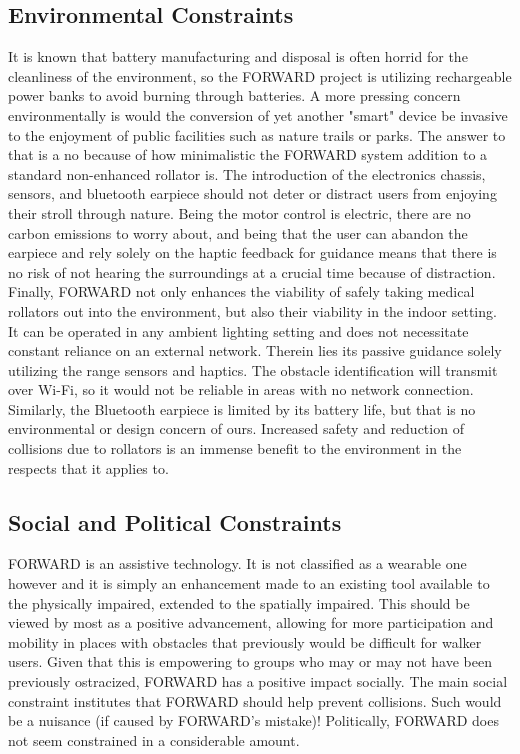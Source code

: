 \subsection{Environmental Constraints}
\noindent It is known that battery manufacturing and disposal is often horrid for the cleanliness of the environment, so the FORWARD project is utilizing rechargeable power banks to avoid burning through batteries. A more pressing concern environmentally is would the conversion of yet another "smart" device be invasive to the enjoyment of public facilities such as nature trails or parks. The answer to that is a no because of how minimalistic the FORWARD system addition to a standard non-enhanced rollator is. The introduction of the electronics chassis, sensors, and bluetooth earpiece should not deter or distract users from enjoying their stroll through nature. Being the motor control is electric, there are no carbon emissions to worry about, and being that the user can abandon the earpiece and rely solely on the haptic feedback for guidance means that there is no risk of not hearing the surroundings at a crucial time because of distraction. Finally, FORWARD not only enhances the viability of safely taking medical rollators out into the environment, but also their viability in the indoor setting. It can be operated in any ambient lighting setting and does not necessitate constant reliance on an external network. Therein lies its passive guidance solely utilizing the range sensors and haptics. The obstacle identification will transmit over Wi-Fi, so it would not be reliable in areas with no network connection. Similarly, the Bluetooth earpiece is limited by its battery life, but that is no environmental or design concern of ours. Increased safety and reduction of collisions due to rollators is an immense benefit to the environment in the respects that it applies to.\\

\subsection{Social and Political Constraints}
\noindent FORWARD is an assistive technology. It is not classified as a wearable one however and it is simply an enhancement made to an existing tool available to the physically impaired, extended to the spatially impaired. This should be viewed by most as a positive advancement, allowing for more participation and mobility in places with obstacles that previously would be difficult for walker users. Given that this is empowering to groups who may or may not have been previously ostracized, FORWARD has a positive impact socially. The main social constraint institutes that FORWARD should help prevent collisions. Such would be a nuisance (if caused by FORWARD's mistake)! Politically, FORWARD does not seem constrained in a considerable amount.\\ 